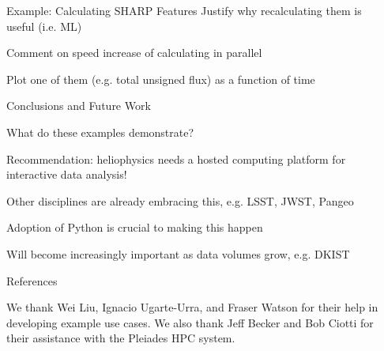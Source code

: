 \documentclass[final]{beamer}
\newlength{\sepwidth}
\newlength{\colwidth}
\newcommand{\separatorcolumn}{\begin{column}{\sepwidth}\end{column}}
\begin{document}
\begin{frame}[t]
\begin{columns}[t]
\begin{column}{\colwidth}
\begin{block}{Example: Calculating SHARP Features}
    Justify why recalculating them is useful (i.e. ML)

    Comment on speed increase of calculating in parallel

    Plot one of them (e.g. total unsigned flux) as a function of time

  \end{block}

  \begin{block}{Conclusions and Future Work}

    What do these examples demonstrate?

    Recommendation: heliophysics needs a hosted computing platform for interactive data analysis!

    Other disciplines are already embracing this, e.g. LSST, JWST, Pangeo

    Adoption of Python is crucial to making this happen 

    Will become increasingly important as data volumes grow, e.g. DKIST

  \end{block}

  \begin{block}{References}
    \scriptsize

    We thank Wei Liu, Ignacio Ugarte-Urra, and Fraser Watson for their help in developing example use cases. We also thank Jeff Becker and Bob Ciotti for their assistance with the Pleiades HPC system. 

      \begin{multicols}{2}
        
        
      \end{multicols}

  \end{block}

\end{column}

\separatorcolumn
\end{columns}
\end{frame}
\end{document}
